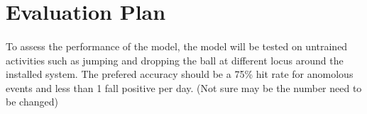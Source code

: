 \section{Evaluation Plan}
\paragraph{}
To assess the performance of the model, the model will be tested on untrained activities such as jumping and dropping the ball at different locus around the installed system. The prefered accuracy should be a 75\% hit rate for anomolous events and less than 1 fall positive per day. (Not sure may be the number need to be changed)

\FloatBarrier